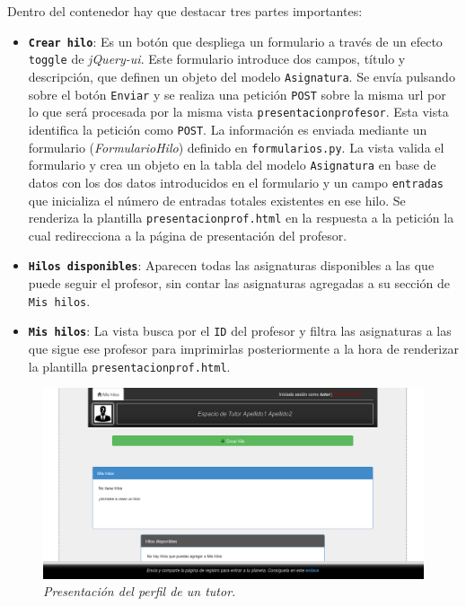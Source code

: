 \documentclass[a4paper, 12pt]{book}
\begin{document}
Dentro del contenedor hay que destacar tres partes importantes:
\begin{itemize}
  \item {\bfseries \texttt{Crear hilo}}: Es un bot\'on que despliega un formulario a trav\'es de un efecto \texttt{toggle} de \textit{jQuery-ui}. Este 
  formulario introduce dos campos, t\'itulo y descripci\'on, que definen un objeto del modelo \texttt{Asignatura}. Se env\'ia pulsando sobre el bot\'on
  \texttt{Enviar} y se realiza una petici\'on \texttt{POST} sobre la misma url por lo que ser\'a procesada por la misma vista \texttt{presentacionprofesor}.
  Esta vista identifica la petici\'on como \texttt{POST}. La informaci\'on es enviada mediante un formulario (\textit{FormularioHilo}) definido en 
  \texttt{formularios.py}. La vista valida el formulario y crea un objeto en la tabla del modelo \texttt{Asignatura} en base de datos con los dos datos 
  introducidos en el formulario y un campo \texttt{entradas} que inicializa el n\'umero de entradas totales existentes en ese hilo. Se renderiza 
  la plantilla \texttt{presentacionprof.html} en la respuesta a la petici\'on la cual redirecciona a la p\'agina de presentaci\'on del profesor. 
  \item {\bfseries \texttt{Hilos disponibles}}: Aparecen todas las asignaturas disponibles a las que puede seguir el profesor, sin contar las asignaturas
  agregadas a su secci\'on de \texttt{Mis hilos}.
  \item {\bfseries \texttt{Mis hilos}}: La vista busca por el \texttt{ID} del profesor y filtra las asignaturas a las que sigue ese profesor para 
  imprimirlas posteriormente a la hora de renderizar la plantilla \texttt{presentacionprof.html}.
\end{itemize}

\begin{figure}
  \centering
  \includegraphics[width=17cm, keepaspectratio]{imagenes/PresentacionTutor}
  \caption{\textit{Presentaci\'on del perfil de un tutor.}}
  \label{fig:presentaciontutor}
\end{figure}
\end{document}
